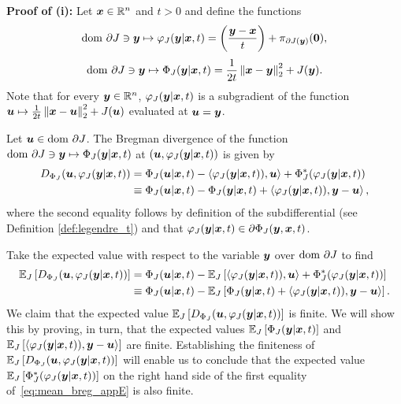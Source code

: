 \textbf{Proof of (i):} Let $\bx \in \Rn$ and $t > 0$ and define the functions
\begin{equation*}
    \dom\partial J \ni \by \mapsto \varphi_J(\by|\bx,t) = \left(\frac{\by-\bx}{t}\right) + \pi_{\partial J(\by)}(\boldsymbol{0}),
\end{equation*}
\[
\dom\partial J \ni \by \mapsto \Phi_J(\by|\bx,t) = \frac{1}{2t}\normsq{\bx-\by} + J(\by).
\]
Note that for every $\by \in \Rn$, $\varphi_J(\by|\bx,t)$ is a subgradient of the function $\bu \mapsto \frac{1}{2t}\normsq{\bx-\bu} + J(\bu)$ evaluated at $\bu = \by$.

Let $\bu \in \dom\partial J$. The Bregman divergence of the function $\dom\partial J\ni\by\mapsto\Phi_{J}(\by|\bx,t)$ at $(\bu,\varphi_{J}(\by|\bx,t))$ is given by
\begin{align*}
D_{\Phi_{J}}(\bu,\varphi_{J}(\by|\bx,t)) & =\Phi_{J}(\bu|\bx,t)-\left\langle \varphi_{J}(\by|\bx,t)),\bu\right\rangle +\Phi_{J}^{*}(\varphi_{J}(\by|\bx,t))\\
 & \equiv\Phi_{J}(\bu|\bx,t)-\Phi_{J}(\by|\bx,t)+\left\langle \varphi_{J}(\by|\bx,t)),\by-\bu\right\rangle,
\end{align*}
where the second equality follows by definition of the subdifferential (see Definition \ref{def:legendre_t}) and that $\varphi_{J}(\by|\bx,t) \in \partial \Phi_J(\by,\bx,t)$.

Take the expected value with respect to the variable $\by$ over $\dom\partial J$ to find
\begin{equation}\label{eq:mean_breg_appE}
\begin{alignedat}{1}
\expectationJ{D_{\Phi_{J}}(\bu,\varphi_{J}(\by|\bx,t))} & =\Phi_{J}(\bu|\bx,t)-\expectationJ{\left\langle \varphi_{J}(\by|\bx,t)),\bu\right\rangle + \Phi_{J}^{*}(\varphi_{J}(\by|\bx,t))}\\
&\equiv \Phi_{J}(\bu|\bx,t)-\expectationJ{\Phi_{J}(\by|\bx,t) + \left\langle \varphi_{J}(\by|\bx,t)),\by-\bu\right\rangle}.
\end{alignedat}
\end{equation}
We claim that the expected value $\expectationJ{D_{\Phi_{J}}(\bu,\varphi_{J}(\by|\bx,t))}$ is finite. We will show this by proving, in turn, that the expected values $\expectationJ{\Phi_{J}(\by|\bx,t)}$ and $\expectationJ{\left\langle \varphi_{J}(\by|\bx,t)),\by-\bu\right\rangle}$ are finite. Establishing the finiteness of $\expectationJ{D_{\Phi_{J}}(\bu,\varphi_{J}(\by|\bx,t))}$ will enable us to conclude that the expected value $\expectationJ{\Phi_{J}^{*}(\varphi_{J}(\by|\bx,t))}$ on the right hand side of the first equality of~\eqref{eq:mean_breg_appE} is also finite.

